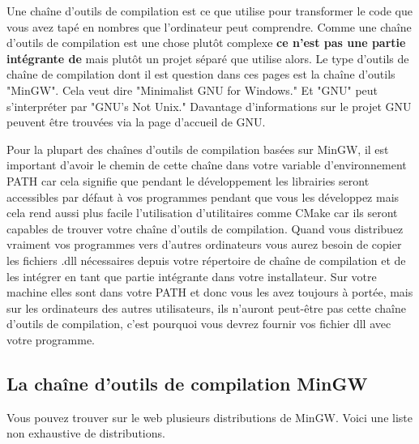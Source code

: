 Une chaîne d'outils de compilation est ce que \codeblocks utilise pour transformer le code que vous avez tapé en nombres que l'ordinateur peut comprendre. Comme une chaîne d'outils de compilation est une chose plutôt complexe \textbf{ce n'est pas une partie intégrante de \codeblocks} mais plutôt un projet séparé que \codeblocks utilise alors. Le type d'outils de chaîne de compilation dont il est question dans ces pages est la chaîne d'outils "MinGW". Cela veut dire "Minimalist GNU for Windows." Et "GNU" peut s'interpréter par "GNU's Not Unix." Davantage d'informations sur le projet GNU peuvent être trouvées via la page d'accueil de GNU.

Pour la plupart des chaînes d'outils de compilation basées sur MinGW, il est important d'avoir le chemin de cette chaîne dans votre variable d'environnement PATH car cela signifie que pendant le développement les librairies seront accessibles par défaut à vos programmes pendant que vous les développez mais cela rend aussi plus facile l'utilisation d'utilitaires comme CMake car ils seront capables de trouver votre chaîne d'outils de compilation. Quand vous distribuez vraiment vos programmes vers d'autres ordinateurs vous aurez besoin de copier les fichiers .dll nécessaires depuis votre répertoire de chaîne de compilation et de les intégrer en tant que partie intégrante dans votre installateur. Sur votre machine elles sont dans votre PATH et donc vous les avez toujours à portée, mais sur les ordinateurs des autres utilisateurs, ils n'auront peut-être pas cette chaîne d'outils de compilation, c'est pourquoi vous devrez fournir vos fichier dll avec votre programme. 

\subsection{La chaîne d'outils de compilation MinGW}\label{sec:install_toolchains}

Vous pouvez trouver sur le web plusieurs distributions de MinGW. Voici une liste non exhaustive de distributions.

